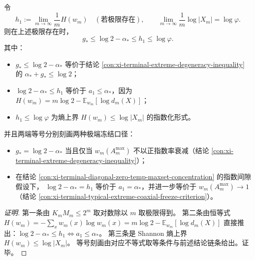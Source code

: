\begin{conclusion}[四量链式刚性：\texorpdfstring{$g_\ast\le \log2-\alpha_\ast\le h_1\le \log\varphi$}{g*<=log2-alpha*<=h1<=logphi} 及其冻结相含义]\label{con:xi-terminal-four-quantity-chain-rigidity}
令
\[
h_1:=\lim_{m\to\infty}\frac{1}{m}H(w_m)
\quad(\text{若极限存在}),\qquad
\lim_{m\to\infty}\frac{1}{m}\log|X_m|=\log\varphi.
\]
则在上述极限存在时，
\[
g_\ast\le \log2-\alpha_\ast\le h_1\le \log\varphi.
\]
其中：
\begin{itemize}
  \item \(g_\ast\le \log2-\alpha_\ast\) 等价于结论 \ref{con:xi-terminal-extreme-degeneracy-inequality} 的 \(\alpha_\ast+g_\ast\le\log2\)；
  \item \(\log2-\alpha_\ast\le h_1\) 等价于 \(a_1\le \alpha_\ast\)，因为
  \(
  H(w_m)=m\log2-\mathbb E_{w_m}[\log d_m(X)]
  \)；
  \item \(h_1\le \log\varphi\) 为熵上界 \(H(w_m)\le \log|X_m|\) 的指数化形式。
\end{itemize}
并且两端等号分别刻画两种极端冻结口径：
\begin{itemize}
  \item \(g_\ast=\log2-\alpha_\ast\) 当且仅当 \(w_m(A_m^{\max})\) 不以正指数率衰减（结论 \ref{con:xi-terminal-extreme-degeneracy-inequality}）；
  \item 在结论 \ref{con:xi-terminal-diagonal-zero-temp-maxset-concentration} 的指数间隙假设下，
  \(\log2-\alpha_\ast=h_1\) 等价于 \(a_1=\alpha_\ast\)，并进一步等价于 \(w_m(A_m^{\max})\to 1\)（结论 \ref{con:xi-terminal-typical-extreme-coaxial-freeze-criterion}）。
\end{itemize}
\end{conclusion}
\begin{proof}[证明]
第一条由 \(K_mM_m\le 2^m\) 取对数除以 \(m\) 取极限得到。
第二条由恒等式
\(
H(w_m)=-\sum_x w_m(x)\log w_m(x)
=m\log2-\mathbb E_{w_m}[\log d_m(X)]
\)
直接推出：\(\log2-\alpha_\ast\le h_1\iff a_1\le\alpha_\ast\)。
第三条是 Shannon 熵上界 \(H(w_m)\le \log|X_m|\)。
等号刻画由对应不等式取等条件与前述结论链条给出。证毕。
\end{proof}
